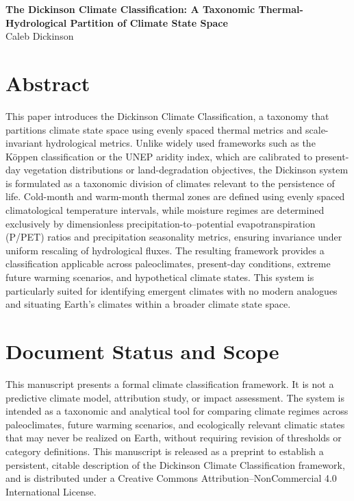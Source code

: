 \documentclass[12pt]{article}
\begin{document}
\begin{center}
{\LARGE \textbf{The Dickinson Climate Classification: A Taxonomic Thermal-Hydrological Partition of Climate State Space}}\\
\vspace{0.25em}
{\large Caleb Dickinson}
\end{center}

\section*{Abstract}

This paper introduces the Dickinson Climate Classification, a taxonomy that partitions climate state space using evenly spaced thermal metrics and scale-invariant hydrological metrics. Unlike widely used frameworks such as the Köppen classification or the UNEP aridity index, which are calibrated to present-day vegetation distributions or land-degradation objectives, the Dickinson system is formulated as a taxonomic division of climates relevant to the persistence of life. Cold-month and warm-month thermal zones are defined using evenly spaced climatological temperature intervals, while moisture regimes are determined exclusively by dimensionless precipitation-to–potential evapotranspiration (P/PET) ratios and precipitation seasonality metrics, ensuring invariance under uniform rescaling of hydrological fluxes. The resulting framework provides a classification applicable across paleoclimates, present-day conditions, extreme future warming scenarios, and hypothetical climate states. This system is particularly suited for identifying emergent climates with no modern analogues and situating Earth’s climates within a broader climate state space.

\section*{Document Status and Scope}

This manuscript presents a formal climate classification framework.
It is not a predictive climate model, attribution study, or impact assessment.
The system is intended as a taxonomic and analytical tool for
comparing climate regimes across paleoclimates, future warming
scenarios, and ecologically relevant climatic states that may never be
realized on Earth, without requiring revision of thresholds or category
definitions. This manuscript is released as a preprint to establish a persistent, citable description of the Dickinson Climate Classification framework, and is distributed under a Creative Commons Attribution–NonCommercial 4.0 International License.
\end{document}
